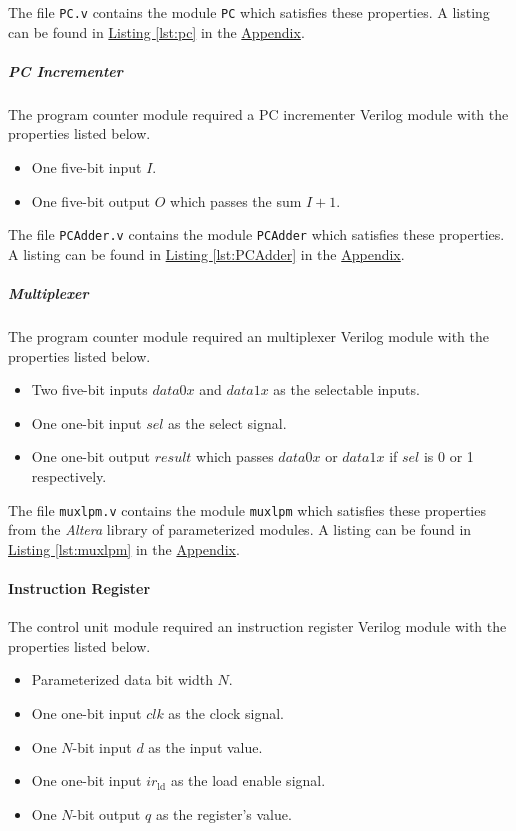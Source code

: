 The file \verb|PC.v| contains the module \verb|PC| which satisfies these properties.
A listing can be found in \hyperref[lst:pc]{Listing \ref*{lst:pc}} in the \hyperref[sec:appendix]{Appendix}.

\subparagraph{PC Incrementer} \label{subpar:pcadder}

The program counter module required a PC incrementer Verilog module with the properties listed below.

\begin{itemize}
    \item One five-bit input $I$.
    \item One five-bit output $O$ which passes the sum $I + 1$.
\end{itemize}

The file \verb|PCAdder.v| contains the module \verb|PCAdder| which satisfies these properties.
A listing can be found in \hyperref[lst:PCAdder]{Listing \ref*{lst:PCAdder}} in the \hyperref[sec:appendix]{Appendix}.

\subparagraph{Multiplexer} \label{subpar:mux}

The program counter module required an multiplexer Verilog module with the properties listed below.

\begin{itemize}
    \item Two five-bit inputs $data0x$ and $data1x$ as the selectable inputs.
    \item One one-bit input $sel$ as the select signal.
    \item One one-bit output $result$ which passes $data0x$ or $data1x$ if $sel$ is 0 or 1 respectively.
\end{itemize}


The file \verb|muxlpm.v| contains the module \verb|muxlpm| which satisfies these properties from the \emph{Altera} library of parameterized modules.
A listing can be found in \hyperref[lst:muxlpm]{Listing \ref*{lst:muxlpm}} in the \hyperref[sec:appendix]{Appendix}.

\paragraph{Instruction Register} \label{par:ir}

The control unit module required an instruction register Verilog module with the properties listed below.

\begin{itemize}
    \item Parameterized data bit width $N$.
    \item One one-bit input $clk$ as the clock signal.
    \item One $N$-bit input $d$ as the input value.
    \item One one-bit input $ir_\text{ld}$ as the load enable signal.
    \item One $N$-bit output $q$ as the register's value.
\end{itemize}

